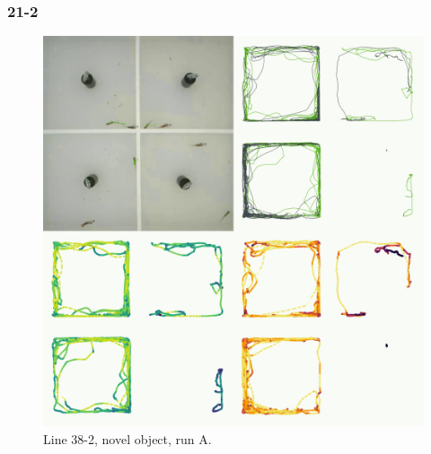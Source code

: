 \documentclass[
]{book}
\begin{document}
\hypertarget{section-11}{%
\subsubsection{21-2}\label{section-11}}



\begin{figure}
\includegraphics[width=1\linewidth]{figs/mikk_behaviour/four_panel_plots/novel_object_20191113_1527_21-2_L_A_300} \caption{Line 38-2, novel object, run A.}\label{fig:4p-21-2-no-A}
\end{figure}
\end{document}
